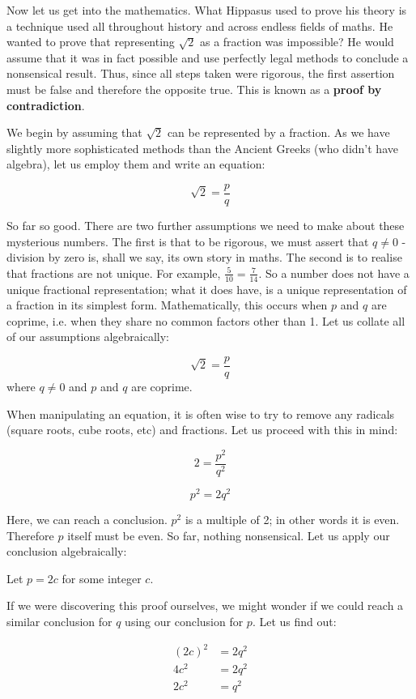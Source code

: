 \documentclass{article}
\begin{document}
Now let us get into the mathematics. What Hippasus used to prove his theory is a technique used all throughout history and across endless fields of maths. He wanted to prove that representing $\sqrt{2}$ as a fraction was impossible? He would assume that it was in fact possible and use perfectly legal methods to conclude a nonsensical result. Thus, since all steps taken were rigorous, the first assertion must be false and therefore the opposite true. This is known as a \textbf{proof by contradiction}.

We begin by assuming that $\sqrt{2}$ can be represented by a fraction. As we have slightly more sophisticated methods than the Ancient Greeks (who didn’t have algebra), let us employ them and write an equation:

$$ \sqrt{2} = \frac{p}{q} $$

So far so good. There are two further assumptions we need to make about these mysterious numbers. The first is that to be rigorous, we must assert that $q \neq 0$ - division by zero is, shall we say, its own story in maths. The second is to realise that fractions are not unique. For example, $\frac{5}{10} = \frac{7}{14}$. So a number does not have a unique fractional representation; what it does have, is a unique representation of a fraction in its simplest form. Mathematically, this occurs when $p$ and $q$ are coprime, i.e. when they share no common factors other than 1. Let us collate all of our assumptions algebraically:

$$ \sqrt{2} = \frac{p}{q} $$
where $q \neq 0$ and $p$ and $q$ are coprime.

When manipulating an equation, it is often wise to try to remove any radicals (square roots, cube roots, etc) and fractions. Let us proceed with this in mind:

$$ 2 = \frac{p^2}{q^2} $$

$$ p^2 = 2q^2 $$

Here, we can reach a conclusion. $p^2$ is a multiple of 2; in other words it is even. Therefore $p$ itself must be even. So far, nothing nonsensical. Let us apply our conclusion algebraically:

Let $p = 2c$ for some integer $c$.

If we were discovering this proof ourselves, we might wonder if we could reach a similar conclusion for $q$ using our conclusion for $p$. Let us find out:

\begin{align*}
    (2c)^2 &= 2q^2 \\
    4c^2 &= 2q^2 \\
    2c^2 &= q^2
\end{align*}
\end{document}
